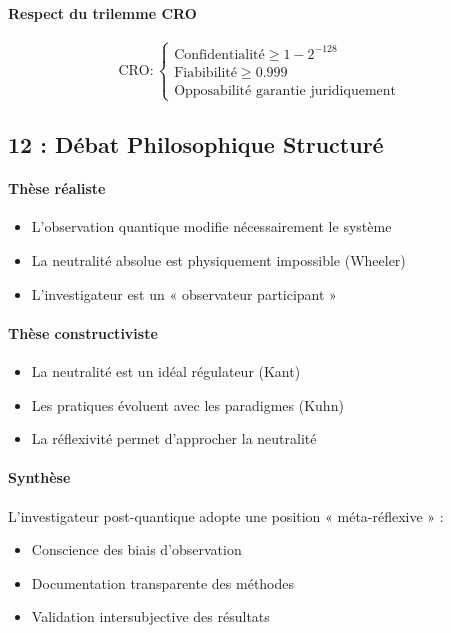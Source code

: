 \documentclass[12pt,a4paper]{article}
\begin{document}
	 \paragraph{Respect du trilemme CRO}
	 \[
	 \text{CRO} : 
	 \begin{cases}
	 	\text{Confidentialité} \geq 1 - 2^{-128} \\
	 	\text{Fiabibilité} \geq 0.999 \\
	 	\text{Opposabilité} \text{ garantie juridiquement}
	 \end{cases}
	 \]
	 
	 \subsection*{12 : Débat Philosophique Structuré}
	 
	 \paragraph{Thèse réaliste}
	 \begin{itemize}
	 	\item L'observation quantique modifie nécessairement le système
	 	\item La neutralité absolue est physiquement impossible (Wheeler)
	 	\item L'investigateur est un « observateur participant »
	 \end{itemize}
	 
	 \paragraph{Thèse constructiviste}
	 \begin{itemize}
	 	\item La neutralité est un idéal régulateur (Kant)
	 	\item Les pratiques évoluent avec les paradigmes (Kuhn)
	 	\item La réflexivité permet d'approcher la neutralité
	 \end{itemize}
	 
	 \paragraph{Synthèse}
	 L'investigateur post-quantique adopte une position « méta-réflexive » :
	 \begin{itemize}
	 	\item Conscience des biais d'observation
	 	\item Documentation transparente des méthodes
	 	\item Validation intersubjective des résultats
	 \end{itemize}
	 
\end{document}
